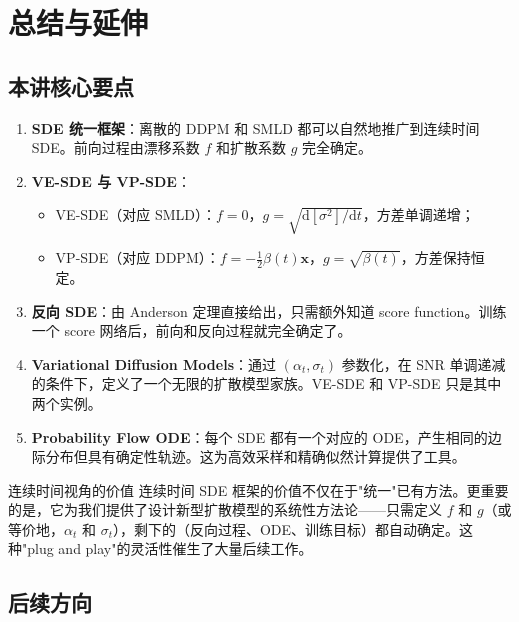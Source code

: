 \section{总结与延伸}

\subsection{本讲核心要点}

\begin{enumerate}
    \item \textbf{SDE 统一框架}：离散的 DDPM 和 SMLD 都可以自然地推广到连续时间 SDE。前向过程由漂移系数 $f$ 和扩散系数 $g$ 完全确定。

    \item \textbf{VE-SDE 与 VP-SDE}：
    \begin{itemize}
        \item VE-SDE（对应 SMLD）：$f = 0$，$g = \sqrt{\mathrm{d}[\sigma^2]/\mathrm{d}t}$，方差单调递增；
        \item VP-SDE（对应 DDPM）：$f = -\frac{1}{2}\beta(t)\mathbf{x}$，$g = \sqrt{\beta(t)}$，方差保持恒定。
    \end{itemize}

    \item \textbf{反向 SDE}：由 Anderson 定理直接给出，只需额外知道 score function。训练一个 score 网络后，前向和反向过程就完全确定了。

    \item \textbf{Variational Diffusion Models}：通过 $(\alpha_t, \sigma_t)$ 参数化，在 SNR 单调递减的条件下，定义了一个无限的扩散模型家族。VE-SDE 和 VP-SDE 只是其中两个实例。

    \item \textbf{Probability Flow ODE}：每个 SDE 都有一个对应的 ODE，产生相同的边际分布但具有确定性轨迹。这为高效采样和精确似然计算提供了工具。
\end{enumerate}

\begin{importantbox}{连续时间视角的价值}
连续时间 SDE 框架的价值不仅在于"统一"已有方法。更重要的是，它为我们提供了设计新型扩散模型的系统性方法论——只需定义 $f$ 和 $g$（或等价地，$\alpha_t$ 和 $\sigma_t$），剩下的（反向过程、ODE、训练目标）都自动确定。这种"plug and play"的灵活性催生了大量后续工作。
\end{importantbox}

\subsection{后续方向}

